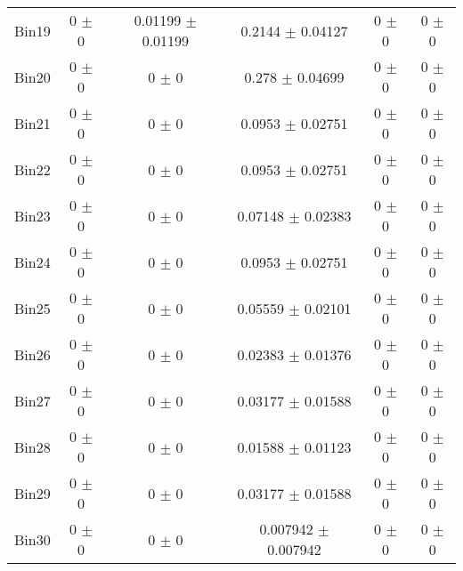 \begin{tabular}{@{\extracolsep{4pt}}lccccc@{}}
     Bin19 & 0 $\pm$ 0 & 0.01199 $\pm$ 0.01199 & 0.2144 $\pm$ 0.04127 & 0 $\pm$ 0 & 0 $\pm$ 0 \\ 
     Bin20 & 0 $\pm$ 0 & 0 $\pm$ 0 & 0.278 $\pm$ 0.04699 & 0 $\pm$ 0 & 0 $\pm$ 0 \\ 
     Bin21 & 0 $\pm$ 0 & 0 $\pm$ 0 & 0.0953 $\pm$ 0.02751 & 0 $\pm$ 0 & 0 $\pm$ 0 \\ 
     Bin22 & 0 $\pm$ 0 & 0 $\pm$ 0 & 0.0953 $\pm$ 0.02751 & 0 $\pm$ 0 & 0 $\pm$ 0 \\ 
     Bin23 & 0 $\pm$ 0 & 0 $\pm$ 0 & 0.07148 $\pm$ 0.02383 & 0 $\pm$ 0 & 0 $\pm$ 0 \\ 
     Bin24 & 0 $\pm$ 0 & 0 $\pm$ 0 & 0.0953 $\pm$ 0.02751 & 0 $\pm$ 0 & 0 $\pm$ 0 \\ 
     Bin25 & 0 $\pm$ 0 & 0 $\pm$ 0 & 0.05559 $\pm$ 0.02101 & 0 $\pm$ 0 & 0 $\pm$ 0 \\ 
     Bin26 & 0 $\pm$ 0 & 0 $\pm$ 0 & 0.02383 $\pm$ 0.01376 & 0 $\pm$ 0 & 0 $\pm$ 0 \\ 
     Bin27 & 0 $\pm$ 0 & 0 $\pm$ 0 & 0.03177 $\pm$ 0.01588 & 0 $\pm$ 0 & 0 $\pm$ 0 \\ 
     Bin28 & 0 $\pm$ 0 & 0 $\pm$ 0 & 0.01588 $\pm$ 0.01123 & 0 $\pm$ 0 & 0 $\pm$ 0 \\ 
     Bin29 & 0 $\pm$ 0 & 0 $\pm$ 0 & 0.03177 $\pm$ 0.01588 & 0 $\pm$ 0 & 0 $\pm$ 0 \\ 
     Bin30 & 0 $\pm$ 0 & 0 $\pm$ 0 & 0.007942 $\pm$ 0.007942 & 0 $\pm$ 0 & 0 $\pm$ 0 \\ 
\hline\hline
  \end{tabular}
